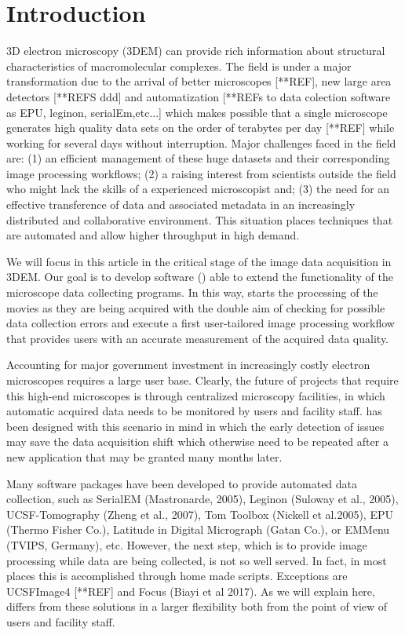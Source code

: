 
\section{Introduction}

3D electron microscopy (3DEM)  can provide rich information about structural characteristics of macromolecular complexes. The field is under a major transformation due to the arrival of better microscopes [**REF], new large area detectors [**REFS ddd] and automatization [**REFs to data colection software as EPU, leginon, serialEm,etc...]  which makes possible that a single microscope generates high quality data sets on the order of terabytes per day [**REF] while working for several days without interruption. Major challenges faced in the field are: (1) an efficient management of these huge datasets and their corresponding image processing workflows; (2) a raising interest from scientists outside the field who might lack the skills of a experienced microscopist and; (3) the need for an effective transference of data and associated metadata in an increasingly distributed and collaborative environment. This situation places techniques that are automated and allow higher throughput in high demand. 

We will focus in this article in the critical stage of the image data acquisition in 3DEM.  Our goal is  to develop software (\scipionbox) able to extend the functionality of the microscope data collecting programs. In this way, \scipionbox starts the processing of the movies as they are being acquired with the double aim of checking for possible data collection errors and execute a first user-tailored image processing workflow that provides users with an accurate measurement of the acquired data quality.

Accounting for major government investment in increasingly costly electron microscopes requires a large user  base. Clearly, the future of projects that require this high-end microscopes is through centralized microscopy facilities, in which automatic acquired data needs to be monitored by users and facility staff. \scipionbox has been designed with this scenario in mind in which the early detection of issues may save the data acquisition shift which otherwise need to be repeated after a new application that may be granted many months later.

Many software packages have been developed to provide automated data collection, such as SerialEM (Mastronarde, 2005), Leginon (Suloway et al., 2005), UCSF-Tomography (Zheng et al., 2007), Tom Toolbox (Nickell et al.2005), EPU (Thermo Fisher Co.), Latitude in Digital Micrograph (Gatan Co.), or EMMenu
(TVIPS, Germany), etc. However, the next step,  which is to provide image processing while  data are being collected, is not so well served. In fact, in most places this is accomplished through home made scripts. Exceptions are UCSFImage4 [**REF] and Focus (Biayi et al 2017). As we will explain here, \scipionbox differs from these solutions in a larger flexibility both from the point of view of users and facility staff.
